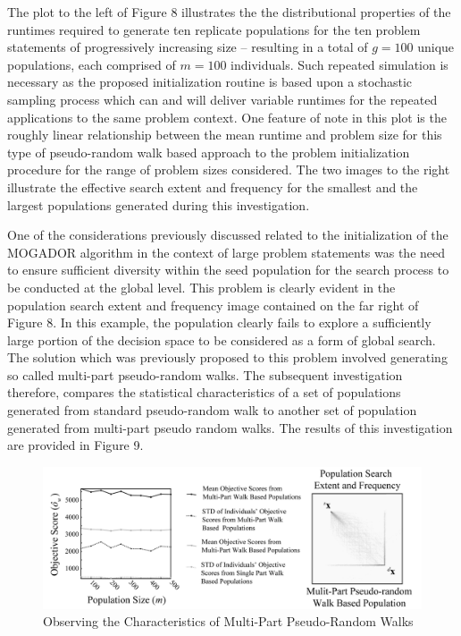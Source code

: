 The plot to the left of Figure 8 illustrates the the distributional properties of the runtimes required to generate ten replicate populations for the ten problem statements of progressively increasing size – resulting in a total of $g = 100$ unique populations, each comprised of $m = 100$ individuals. Such repeated simulation is necessary as the proposed initialization routine is based upon a stochastic sampling process which can and will deliver variable runtimes for the repeated applications to the same problem context. One feature of note in this plot is the roughly linear relationship between the mean runtime and problem size for this type of pseudo-random walk based approach to the problem initialization procedure for the range of problem sizes considered. The two images to the right illustrate the effective search extent and frequency for the smallest and the largest populations generated during this investigation.
            
One of the considerations previously discussed related to the initialization of the MOGADOR algorithm in the context of large problem statements was the need to ensure sufficient diversity within the seed population for the search process to be conducted at the global level. This problem is clearly evident in the population search extent and frequency image contained on the far right of Figure 8.  In this example, the population clearly fails to explore a sufficiently large portion of the decision space to be considered as a form of global search. The solution which was previously proposed to this problem involved generating so called multi-part pseudo-random walks. The subsequent investigation therefore, compares the statistical characteristics of a set of populations generated from standard pseudo-random walk to another set of population generated from multi-part pseudo random walks. The results of this investigation are provided in Figure 9.
            
            \begin{figure}[Observing the Characteristics of Multi-Part Pseudo-Random Walks]
            \centering
            \includegraphics[width=5.5in]{figures/multi-part-walk-study.png}
            \caption[Observing the Characteristics of Multi-Part Pseudo-Random Walks]{Observing the Characteristics of Multi-Part Pseudo-Random Walks}
            \label{fig:multi-part-walk-study}
            \end{figure}
            

